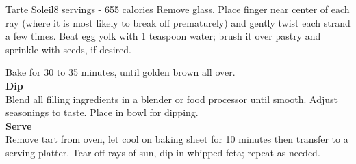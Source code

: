 \begin{recipe}{Tarte Soleil}{8 servings - 655 calories}{}
Remove glass. Place finger near center of each ray (where it is most likely to break off prematurely) and gently twist each strand a few times. Beat egg yolk with 1 teaspoon water; brush it over pastry and sprinkle with seeds, if desired.\newpage

Bake for 30 to 35 minutes, until golden brown all over.\\

\textbf{Dip}\\

Blend all filling ingredients in a blender or food processor until smooth. Adjust seasonings to taste. Place in bowl for dipping.\\

\textbf{Serve}\\

Remove tart from oven, let cool on baking sheet for 10 minutes then transfer to a serving platter. Tear off rays of sun, dip in whipped feta; repeat as needed.

\end{recipe}